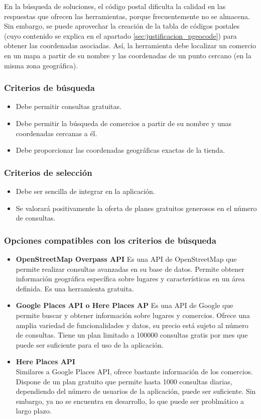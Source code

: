 En la búsqueda de soluciones, el código postal dificulta la calidad en las respuestas que ofrecen las herramientas, porque frecuentemente no se almacena. Sin embargo, se puede aprovechar la creación de la tabla de códigos postales (cuyo contenido se explica en el apartado \ref{sec:justificacion_pgeocode}) para obtener las coordenadas asociadas. Así, la herramienta debe localizar un comercio en un mapa a partir de su nombre y las coordenadas de un punto cercano (en la misma zona geográfica).

\subsubsection{Criterios de búsqueda}
\begin{itemize}
    \item Debe permitir consultas gratuitas.
    \item Debe permitir la búsqueda de comercios a partir de su nombre y unas coordenadas cercanas a él.
    \item Debe proporcionar las coordenadas geográficas exactas de la tienda.
\end{itemize}

\subsubsection{Criterios de selección}
\begin{itemize}
    \item Debe ser sencilla de integrar en la aplicación.
    \item Se valorará positivamente la oferta de planes gratuitos generosos en el número de consultas.
\end{itemize}

\subsubsection{Opciones compatibles con los criterios de búsqueda}
\begin{itemize}
    \item \textbf{OpenStreetMap Overpass API}
    Es una API de OpenStreetMap que permite realizar consultas avanzadas en su base de datos. Permite obtener información geográfica específica sobre lugares y características en un área definida. Es una herramienta gratuita.
    \item \textbf{Google Places API o Here Places AP}
    Es una API de Google que permite buscar y obtener información sobre lugares y comercios. Ofrece una amplia variedad de funcionalidades y datos, su precio está sujeto al número de consultas. Tiene un plan limitado a 100000 consultas gratis por mes que puede ser suficiente para el uso de la aplicación\cite{google_places_api}.
    \item \textbf{Here Places API}\\
    Similares a Google Places API, ofrece bastante información de los comercios. Dispone de un plan gratuito que permite hasta 1000 consultas diarias, dependiendo del número de usuarios de la aplicación, puede ser suficiente. Sin embargo, ya no se encuentra en desarrollo, lo que puede ser problmático a largo plazo\cite{here_places_api}.
\end{itemize}

